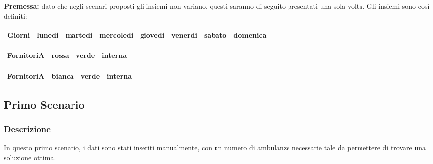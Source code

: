 \textbf{Premessa: } dato che negli scenari proposti gli insiemi non variano, questi saranno di seguito presentati una sola volta.
Gli insiemi sono così definiti: \newline \vspace*{0.1 cm} \newline
\begin{tabular}{|| c || c c c c c c c ||}
    \hline
    Giorni & lunedi & martedi & mercoledi & giovedi & venerdi & sabato & domenica \\ 
    \hline
\end{tabular}
\newline
\vspace*{0.3 cm}
\newline
\begin{tabular}{|| c || c c c ||}
    \hline
        FornitoriA & rossa & verde & interna \\
    \hline
\end{tabular}
\newline
\vspace*{0.3 cm}
\newline
\begin{tabular}{|| c || c c c ||}
    \hline
        FornitoriA & bianca & verde & interna \\
    \hline
\end{tabular}

\subsection{Primo Scenario}
\subsubsection{Descrizione}
In questo primo scenario, i dati sono stati inseriti manualmente, con un numero di ambulanze necessarie tale da permettere di trovare una soluzione ottima.
